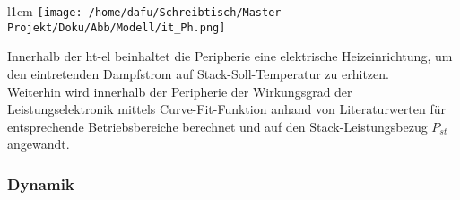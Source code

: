 \documentclass[onecolumn,10pt,titlepage]{article}
\begin{document}
\begin{wrapfigure}{l}{1cm}
	\texttt{[image: /home/dafu/Schreibtisch/Master-Projekt/Doku/Abb/Modell/it\_Ph.png]}
\end{wrapfigure}
Innerhalb der \gls{ht}-\gls{el} beinhaltet die Peripherie eine elektrische Heizeinrichtung, um den eintretenden Dampfstrom auf Stack-Soll-Temperatur zu erhitzen. 
\vspace{2cm}
\\Weiterhin wird innerhalb der Peripherie der Wirkungsgrad der Leistungselektronik mittels Curve-Fit-Funktion anhand von Literaturwerten für entsprechende Betriebsbereiche berechnet und auf den Stack-Leistungsbezug $P_{st}$ angewandt.
%


\newpage
\subsubsection{Dynamik}
\label{subsubs_mod_Dyn}
\end{document}
